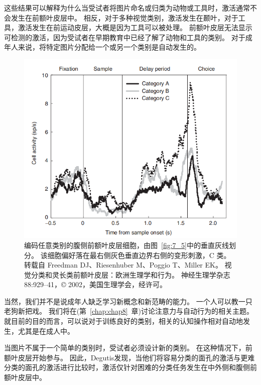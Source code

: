 这些结果可以解释为什么当受试者将图片命名或归类为动物或工具时，激活通常不会发生在前额叶皮层中\cite{martin2007representation}。
相反，对于多种视觉类别，激活发生在颞叶，对于工具，激活发生在前运动皮层，大概是因为工具可以被处理。
前额叶皮层无法显示可检测的激活，因为受试者在早期教育中已经了解了动物和工具的类别。
对于成年人来说，将特定图片分配给一个或另一个类别是自动发生的。


\begin{figure}
	\centering
	\includegraphics[width=0.6\linewidth]{image_pfc/Fig_7_7}
	\caption{编码任意类别的腹侧前额叶皮层细胞，由图~\ref{fig:7_5}中的垂直灰线划分。
		该细胞偏好落在最右侧灰色垂直边界右侧的变形刺激，C 类。
		转载自 Freedman DJ、Riesenhuber M、Poggio T、Miller EK。 
		视觉分类和灵长类前额叶皮层：欧洲生理学和行为。 
		神经生理学杂志 88:929–41，© 2002，美国生理学会，经许可。\label{fig:7_7}}
\end{figure}
\par


当然，我们并不是说成年人缺乏学习新概念和新范畴的能力。 
一个人可以教一只老狗新把戏。 
我们将在(第~\ref{chap:chap8}~章)讨论注意力与自动行为的相关主题。
就目前的目的而言，可以说对于训练良好的类别，相关的认知操作相对自动地发生，尤其是在成人中。
\par


当图片不属于一个简单的类别时，受试者必须设计新的类别。 
在这种情况下，前额叶皮层开始参与。 
因此，Degutis\cite{degutis2007distinct}发现，当他们将容易分类的面孔的激活与更难分类的面孔的激活进行比较时，激活仅针对困难的分类任务发生在中外侧和腹侧前额叶皮层中。



